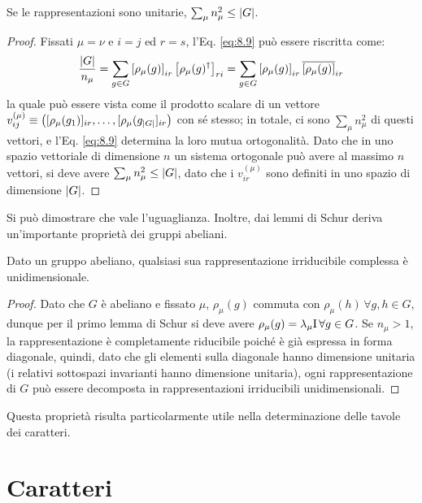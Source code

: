 \begin{corollary}\label{cond-n-mu}
	Se le rappresentazioni sono unitarie, $ \sum_{\mu} n_{\mu}^2 \le \left\lvert G\right\rvert $.
\end{corollary}
\begin{proof}
	Fissati $ \mu = \nu $ e $ i = j $ ed $ r = s $, l'Eq. \ref{eq:8.9} può essere riscritta come:
	\begin{equation*}
		\frac{\left\lvert G\right\rvert}{n_{\mu}} = \sum_{g \in G} \left[ \rho_{\mu}(g) \right]_{ir} \left[ \rho_{\mu}(g)^{\dagger} \right]_{ri} = \sum_{g \in G} \left[ \rho_{\mu}(g) \right]_{ir} \overline{\left[ \rho_{\mu}(g) \right]}_{ir}
	\end{equation*}
	la quale può essere vista come il prodotto scalare di un vettore $ v^{(\mu)}_{ij} \equiv \left( [\rho_{\mu}(g_1)]_{ir}, \dots, [\rho_{\mu}(g_{\left\lvert G\right\rvert}]_{ir} \right) $ con sé stesso; in totale, ci sono $ \sum_{\mu} n_{\mu}^2 $ di questi vettori, e l'Eq. \ref{eq:8.9} determina la loro mutua ortogonalità. Dato che in uno spazio vettoriale di dimensione $ n $ un sistema ortogonale può avere al massimo $ n $ vettori, si deve avere $ \sum_{\mu} n_{\mu}^2 \le \left\lvert G\right\rvert $, dato che i $ v^{(\mu)}_{ir} $ sono definiti in uno spazio di dimensione $ \left\lvert G\right\rvert $.
\end{proof}

Si può dimostrare che vale l'uguaglianza. Inoltre, dai lemmi di Schur deriva un'importante proprietà dei gruppi abeliani.

\begin{proposition}\label{irrep-unidim}
	Dato un gruppo abeliano, qualsiasi sua rappresentazione irriducibile complessa è unidimensionale.
\end{proposition}
\begin{proof}
	Dato che $ G $ è abeliano e fissato $ \mu $, $ \rho_{\mu}(g) $ commuta con $ \rho_{\mu}(h) \,\forall g,h \in G $, dunque per il primo lemma di Schur si deve avere $ \rho_{\mu}(g) = \lambda_{\mu} \mathrm{I} \,\forall g \in G $. Se $ n_{\mu} > 1 $, la rappresentazione è completamente riducibile poiché è già espressa in forma diagonale, quindi, dato che gli elementi sulla diagonale hanno dimensione unitaria (i relativi sottospazi invarianti hanno dimensione unitaria), ogni rappresentazione di $ G $ può essere decomposta in rappresentazioni irriducibili unidimensionali.
\end{proof}

Questa proprietà risulta particolarmente utile nella determinazione delle tavole dei caratteri.

\section{Caratteri}

